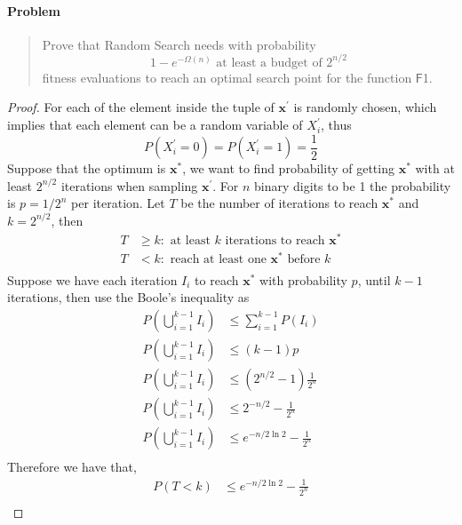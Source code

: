 \documentclass[a4paper, 12pt]{article}
\begin{document}
\paragraph{Problem}
    \begin{quote}
        Prove that Random Search needs with probability
        \[
            1 - e^{-\Omega(n)} 
            \text{ at least a budget of } 
            2^{n/2} 
        \]
        fitness evaluations to reach an optimal search point for the function $\mathsf{F}$1.
    \end{quote}
\begin{proof}
    For each of the element inside the tuple of $\mathbf{x}^\prime$ is randomly chosen, which implies that each element can be a random variable of
    $X^\prime_i$, thus
    \begin{equation*}
        P(X^\prime_i = 0) = P(X^\prime_i = 1) = \frac{1}{2} 
    \end{equation*}
    Suppose that the optimum is $\mathbf{x}^*$, we want to find probability of getting $\mathbf{x}^*$ with at least $2^{n/2}$ iterations when sampling 
    $\mathbf{x}^\prime$. For $n$ binary digits to be 1 the probability is $p = 1/2^n$ per iteration. Let $T$ be the number of iterations to reach $\mathbf{x}^*$
    and $k = 2^{n/2}$, then
    \begin{align*}
        T &\geq k:\text{ at least $k$ iterations to reach $\mathbf{x}^*$}\\
        T &< k: \text{ reach at least one $\mathbf{x}^*$ before $k$}\\
    \end{align*}
    Suppose we have each iteration $I_i$ to reach $\mathbf{x}^*$ with probability $p$, until $k-1$ iterations, then use the Boole's inequality as
    \begin{align*}
        P\left(\bigcup^{k-1}_{i=1}I_i\right) &\leq \sum_{i = 1}^{k-1}P(I_i)\\
        P\left(\bigcup^{k-1}_{i=1}I_i\right) &\leq (k-1)p\\
        P\left(\bigcup^{k-1}_{i=1}I_i\right) &\leq \left(2^{n/2} - 1\right)\frac{1}{2^n}\\
        P\left(\bigcup^{k-1}_{i=1}I_i\right) &\leq 2^{-n/2} - \frac{1}{2^n}\\
        P\left(\bigcup^{k-1}_{i=1}I_i\right) &\leq e^{-n/2\ln2}- \frac{1}{2^n}\\
    \end{align*}
    Therefore we have that,
    \begin{align*}
        P(T < k) &\leq e^{-n/2\ln2}- \frac{1}{2^n}\\

\end{align*}
\end{proof}
\end{document}
